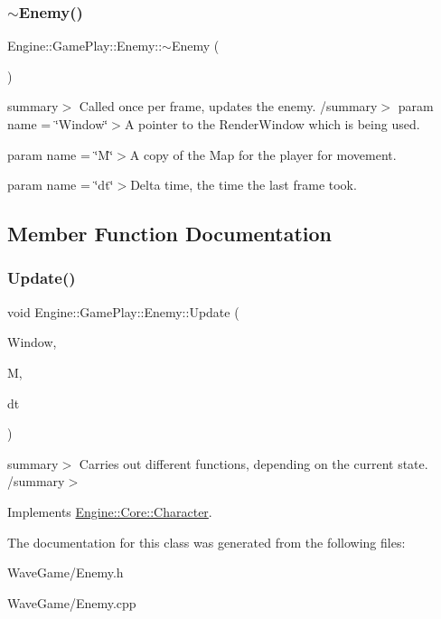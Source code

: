 \subsubsection{\texorpdfstring{$\sim$\+Enemy()}{~Enemy()}}
{\footnotesize\ttfamily Engine\+::\+Game\+Play\+::\+Enemy\+::$\sim$\+Enemy (\begin{DoxyParamCaption}{ }\end{DoxyParamCaption})}

summary$>$ Called once per frame, updates the enemy. /summary$>$ param name = \char`\"{}\+Window\char`\"{}$>$A pointer to the Render\+Window which is being used.

param name = \char`\"{}\+M\char`\"{}$>$A copy of the Map for the player for movement.

param name = \char`\"{}dt\char`\"{}$>$Delta time, the time the last frame took.

\subsection{Member Function Documentation}
\mbox{\label{class_engine_1_1_game_play_1_1_enemy_abc8825ecfc278a6308e8e8bd523cb03f}} 
\subsubsection{\texorpdfstring{Update()}{Update()}}
{\footnotesize\ttfamily void Engine\+::\+Game\+Play\+::\+Enemy\+::\+Update (\begin{DoxyParamCaption}\item[{Render\+Window $\ast$}]{Window,  }\item[{\hyperlink{class_engine_1_1_core_1_1_map}{Map}}]{M,  }\item[{float}]{dt }\end{DoxyParamCaption})\hspace{0.3cm}{\ttfamily [virtual]}}

summary$>$ Carries out different functions, depending on the current state. /summary$>$ 

Implements \hyperlink{class_engine_1_1_core_1_1_character}{Engine\+::\+Core\+::\+Character}.



The documentation for this class was generated from the following files\+:\begin{DoxyCompactItemize}
\item 
Wave\+Game/Enemy.\+h\item 
Wave\+Game/Enemy.\+cpp\end{DoxyCompactItemize}
